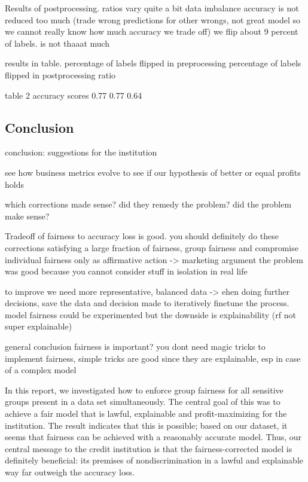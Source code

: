\documentclass{article}
\begin{document}
Results of postprocessing.
ratios vary quite a bit 
data imbalance
accuracy is not reduced too much (trade wrong predictions for other wrongs, not great model so we cannot really know 
how much accuracy we trade off)
we flip about 9 percent of labels. is not thaaat much 

results in table.
    percentage of labels flipped in preprocessing
    percentage of labels flipped in postprocessing
    ratio

table 2 accuracy scores
0.77 0.77 0.64

\subsection*{Conclusion}

conclusion: suggestions for the institution

see how business metrics evolve to see if our hypothesis of better or equal profits holds

which corrections made sense? did they remedy the problem?
did the problem make sense?

Tradeoff of fairness to accuracy loss is good. you should definitely do these corrections
satisfying a large fraction of fairness, group fairness and compromise individual fairness only as affirmative 
action -> marketing argument
the problem was good because you cannot consider stuff in isolation in real life

to improve we need more representative, balanced data -> ehen doing further decisions, save the data and decision made to 
iteratively finetune the process. model fairness could be experimented but the downside is explainability (rf not super 
explainable)

general conclusion
fairness is important?
you dont need magic tricks to implement fairness, simple tricks are good since they are explainable,
    esp in case of a complex model

In this report, we investigated how to enforce group fairness for all sensitive groups present in a data set 
simultaneously. The central goal of this was to achieve a fair model that is lawful, explainable and 
profit-maximizing for the institution. The result indicates that this is possible; based on our dataset, it seems that 
fairness can be achieved with a reasonably accurate model. Thus, our central message to the credit institution
is that the fairness-corrected model is definitely beneficial: its premises of nondiscrimination in a lawful and 
explainable way far outweigh the accuracy loss.
\end{document}

